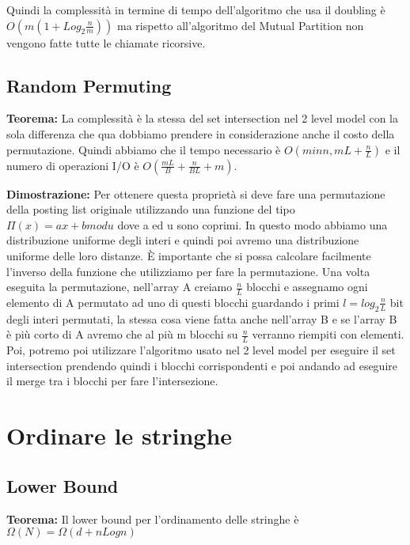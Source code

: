 \documentclass[12pt]{article}
\begin{document}
Quindi la complessità in termine di tempo dell'algoritmo che usa il doubling è $O(m(1+Log_2 \frac{n}{m}))$ ma rispetto all'algoritmo del Mutual Partition non vengono fatte tutte le chiamate ricorsive.

\subsection{Random Permuting} 

\textbf{Teorema:} La complessità è la stessa del set intersection nel 2 level model con la sola differenza che qua dobbiamo prendere in considerazione anche il costo della permutazione. Quindi abbiamo che il tempo necessario è $O(min{n,mL} + \frac{n}{L})$ e il numero di operazioni I/O è $O(\frac{mL}{B} + \frac{n}{BL} + m)$.

\textbf{Dimostrazione:} Per ottenere questa proprietà si deve fare una permutazione della posting list originale utilizzando una funzione del tipo $\Pi(x) = ax + b mod u$ dove a ed u sono coprimi. In questo modo abbiamo una distribuzione uniforme degli interi e quindi poi avremo una distribuzione uniforme delle loro distanze.
È importante che si possa calcolare facilmente l'inverso della funzione che utilizziamo per fare la permutazione.
Una volta eseguita la permutazione, nell'array A creiamo $\frac{n}{L}$ blocchi e assegnamo ogni elemento di A permutato ad uno di questi blocchi guardando i primi $l = log_2 \frac{n}{L}$ bit degli interi permutati, la stessa cosa viene fatta anche nell'array B e se l'array B è più corto di A avremo che al più m blocchi su $\frac{n}{L}$ verranno riempiti con elementi.
Poi, potremo poi utilizzare l'algoritmo usato nel 2 level model per eseguire il set intersection prendendo quindi i blocchi corrispondenti e poi andando ad eseguire il merge tra i blocchi per fare l'intersezione.

\section{Ordinare le stringhe}

\subsection{Lower Bound}

\textbf{Teorema:} Il lower bound per l'ordinamento delle stringhe è $\Omega(N)=\Omega(d+nLogn)$
\end{document}
